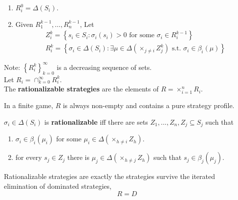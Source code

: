 \documentclass[11pt]{elegantbook}
\begin{document}
\begin{definition}
\normalfont
    \begin{enumerate}[$\bullet$]
        \item $R_i^0=\Delta\left(S_i\right)$.
        \item Given $R_1^{k-1}, \ldots, R_n^{k-1}$, Let
        $$
        \begin{aligned}
        & Z_i^k=\left\{s_i \in S_i: \sigma_i\left(s_i\right)>0 \text { for some } \sigma_i \in R_i^{k-1}\right\} \\
        & R_i^k=\left\{\sigma_i \in \Delta\left(S_i\right): \exists \mu \in \Delta\left(\times_{j \neq i} Z_j^k\right) \text { s.t. } \sigma_i \in \beta_i(\mu)\right\}
        \end{aligned}
        $$
    \end{enumerate}
    Note: $\left\{R_i^k\right\}_{k=0}^{\infty}$ is a decreasing sequence of sets.\\
    Let $R_i=\cap_{k=0}^{\infty} R_i^k$.\\
    The \textbf{rationalizable strategies} are the elements of $R=\times_{i=1}^n R_i$.
\end{definition}

\begin{lemma}
    In a finite game, $R$ is always non-empty and contains a pure strategy profile.
\end{lemma}

\begin{proposition}
    $\sigma_i \in \Delta(S_i)$ is \textbf{rationalizable} iff there are sets $Z_1,..., Z_n, Z_j \subseteq S_j$ such that
    \begin{enumerate}
        \item $\sigma_i \in \beta_i(\mu_i)$ for some $\mu_i \in \Delta(\times_{h\neq i}Z_h)$.
        \item for every $s_j \in Z_j$ there is $\mu_j \in \Delta(\times_{h\neq j}Z_h)$ such that $s_j\in \beta_j(\mu_j)$.
    \end{enumerate}
\end{proposition}

\begin{corollary}[Rationalizable = IEDS]
    Rationalizable strategies are exactly the strategies survive the iterated elimination of dominated strategies, $$R=D$$
\end{corollary}
\end{document}
